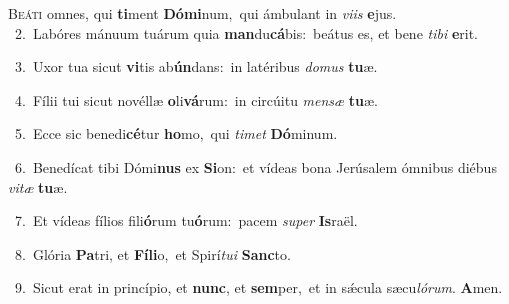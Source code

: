 \lettrine{\initial\textcolor{\initialcolor}{B}}{eáti} omnes, qui \textbf{ti}\-ment \textbf{Dó}\-\textbf{mi}num,~\star qui ámbulant in \textit{vi}\-\textit{is} \textbf{e}\-jus.\\
{\numbfont\textcolor{\numbcolor}{~2.}}~Labóres mánuum tuárum quia \textbf{man}\-du\-\textbf{cá}\-bis:~\star beátus es, et bene \textit{ti}\-\textit{bi} \textbf{e}\-rit.\par
{\numbfont\textcolor{\numbcolor}{~3.}}~Uxor tua sicut \textbf{vi}\-tis ab\-\textbf{ún}\-dans:~\star in latéribus \textit{do}\-\textit{mus} \textbf{tu}\-æ.\par
{\numbfont\textcolor{\numbcolor}{~4.}}~Fílii tui sicut novéllæ \textbf{o}\-li\-\textbf{vá}\-rum:~\star in circúitu \textit{men}\-\textit{sæ} \textbf{tu}\-æ.\par
{\numbfont\textcolor{\numbcolor}{~5.}}~Ecce sic benedi\-\textbf{cé}\-tur \textbf{ho}\-mo,~\star qui \textit{ti}\-\textit{met} \textbf{Dó}\-minum.\par
{\numbfont\textcolor{\numbcolor}{~6.}}~Benedícat tibi Dómi\textbf{nus} ex \textbf{Si}\-on:~\star et vídeas bona Jerúsalem ómnibus diébus \textit{vi}\-\textit{tæ} \textbf{tu}\-æ.\par
{\numbfont\textcolor{\numbcolor}{~7.}}~Et vídeas fílios fili\-\textbf{ó}\-rum tu\-\textbf{ó}\-rum:~\star pacem \textit{su}\-\textit{per} \textbf{Is}\-raël.\par
{\numbfont\textcolor{\numbcolor}{~8.}}~Glória \textbf{Pa}\-tri, et \textbf{Fí}\-\textbf{li}o,~\star et Spirí\-\textit{tu}\-\textit{i} \textbf{Sanc}\-to.\par
{\numbfont\textcolor{\numbcolor}{~9.}}~Sicut erat in princípio, et \textbf{nunc}\-, et \textbf{sem}\-per,~\star et in sǽcula sæcu\-\textit{ló}\-\textit{rum}. \textbf{A}\-men.\par
